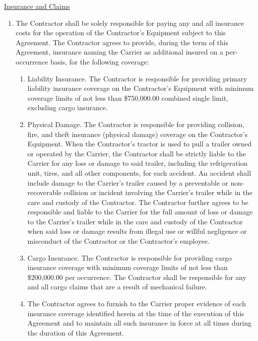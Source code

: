 \underline{Insurance and Claims}
\begin{enumerate}[
    ref = \SecondLevelEnumerator
]
    \item The Contractor shall be solely responsible for paying any and all
    insurance costs for the operation of the Contractor's Equipment subject
    to this Agreement. The Contractor agrees to provide, during the term of
    this Agreement, insurance naming the Carrier as additional insured on a
    per-occurrence basis, for the following coverage:
    \begin{enumerate}[
        ref = \ThirdLevelEnumerator
    ]
        \item Liability Insurance. The Contractor is responsible for
        providing primary liability insurance coverage on the Contractor's
        Equipment with minimum coverage limits of not less than
        \$750,000.00 combined single limit, excluding cargo insurance.

        \item Physical Damage. The Contractor is responsible for providing
        collision, fire, and theft insurance (physical damage) coverage on
        the Contractor's Equipment. When the Contractor's tractor is used
        to pull a trailer owned or operated by the Carrier, the Contractor
        shall be strictly liable to the Carrier for any loss or damage to
        said trailer, including the refrigeration unit, tires, and all
        other components, for each accident. An accident shall include
        damage to the Carrier's trailer caused by a preventable or
        non-recoverable collision or incident involving the Carrier's
        trailer while in the care and custody of the Contractor. The
        Contractor further agrees to be responsible and liable to the
        Carrier for the full amount of loss or damage to the Carrier's
        trailer while in the care and custody of the Contractor when said
        loss or damage results from illegal use or willful negligence or
        misconduct of the Contractor or the Contractor's employee.

        \item Cargo Insurance. The Contractor is responsible for providing
        cargo insurance coverage with minimum coverage limits of not less
        than \$200,000.00 per occurrence. The Contractor shall be
        responsible for any and all cargo claims that are a result of
        mechanical failure.

        \item The Contractor agrees to furnish to the Carrier proper
        evidence of each insurance coverage identified herein at the time
        of the execution of this Agreement and to maintain all such
        insurance in force at all times during the duration of this
        Agreement.


\end{enumerate}
\end{enumerate}

